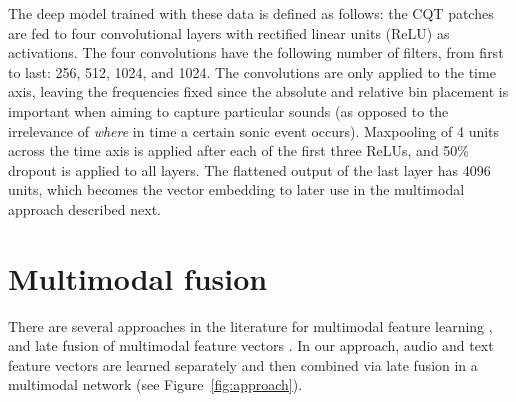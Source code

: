 The deep model trained with these data is defined as follows: the CQT patches are fed to four convolutional layers with rectified linear units (ReLU) as activations.
The four convolutions have the following number of filters, from first to last: 256, 512, 1024, and 1024.
The convolutions are only applied to the time axis, leaving the frequencies fixed since the absolute and relative bin placement is important when aiming to capture particular sounds (as opposed to the irrelevance of \emph{where} in time a certain sonic event occurs).
Maxpooling of 4 units across the time axis is applied after each of the first three ReLUs, and 50\% dropout is applied to all layers.
The flattened output of the last layer has 4096 units, which becomes the vector embedding to later use in the multimodal approach described next.





\section{Multimodal fusion}\label{sec:cold-rec:multimodal}

There are several approaches in the literature for multimodal feature learning \citep{ngiam2011multimodal,srivastava2012learning}, and late fusion of multimodal feature vectors \citep{Bechet2015,Slizovskaia2017}. %
In our approach, audio and text feature vectors are learned separately and then combined via late fusion in a multimodal network (see Figure~\ref{fig:approach}).

